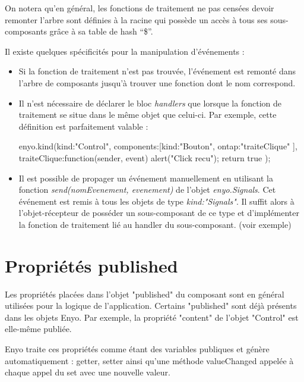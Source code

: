 \documentclass[11pt,a4paper]{report}
\begin{document}
On notera qu'en général, les fonctions de traitement ne pas censées devoir remonter l'arbre
sont définies à la racine qui possède un accès à tous ses sous-composants 
grâce à sa table de hash ``\$''.

Il existe quelques spécificités pour la manipulation d'événements :
\begin{itemize}
\item Si la fonction de traitement n'est pas trouvée, l'événement est remonté dans l'arbre de 
  composants jusqu'à trouver une fonction dont le nom correspond.
\item Il n'est nécessaire de déclarer le bloc \emph{handlers} que lorsque la fonction de traitement
  se situe dans le même objet que celui-ci. Par exemple, cette définition est parfaitement valable :
  \begin{JavaScript}
    enyo.kind({kind:"Control", 
               components:[{kind:"Bouton", 
                            ontap:"traiteClique"}
                          ],
               traiteClique:function(sender, event){
                 alert("Click recu"); return true
               }
    });
  \end{JavaScript}
\item Il est possible de propager un événement manuellement en utilisant la fonction 
  \emph{send(nomEvenement, evenement)} de l'objet \emph{enyo.Signals}. 
  Cet événement est remis à tous les objets de type \emph{kind:"Signals"}. Il suffit alors
  à l'objet-récepteur de posséder un sous-composant de ce type et d'implémenter la fonction de 
  traitement lié au handler du sous-composant. (voir exemple)
\end{itemize}

\section{Propriétés published}\label{sec:published}
Les propriétés placées dans l'objet "published" du composant sont en général utilisées pour
la logique de l'application. Certains "published" sont déjà présents dans les objets Enyo. 
Par exemple, la propriété "content" de l'objet "Control" est elle-même publiée.

Enyo traite ces propriétés comme étant des variables publiques et génère automatiquement : 
getter, setter ainsi qu'une méthode valueChanged appelée à chaque appel du set avec une nouvelle valeur.
\\\medskip
\end{document}
